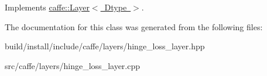 Implements \mbox{\hyperlink{classcaffe_1_1_layer_a576ac6a60b1e99fe383831f52a6cea77}{caffe\+::\+Layer$<$ Dtype $>$}}.



The documentation for this class was generated from the following files\+:\begin{DoxyCompactItemize}
\item 
build/install/include/caffe/layers/hinge\+\_\+loss\+\_\+layer.\+hpp\item 
src/caffe/layers/hinge\+\_\+loss\+\_\+layer.\+cpp\end{DoxyCompactItemize}

